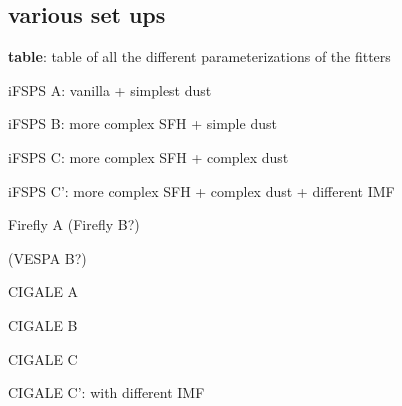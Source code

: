 \subsection{various set ups}


{\bf table}: table of all the different parameterizations of the fitters 

iFSPS A: vanilla + simplest dust

iFSPS B: more complex SFH + simple dust

iFSPS C: more complex SFH + complex dust

iFSPS C': more complex SFH + complex dust + different IMF 

Firefly A (Firefly B?) 

(VESPA B?) 

CIGALE A

CIGALE B

CIGALE C
 
CIGALE C': with different IMF 
